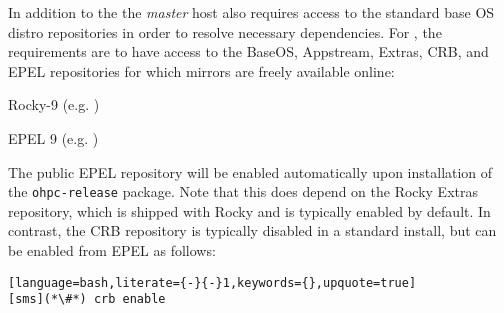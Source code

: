 In addition to the \OHPC{}
\iftoggle{isxCAT}{and \xCAT{} package repositories,}{package repository,}
the {\em master} host also requires access to the standard base OS distro
repositories in order to resolve necessary dependencies. For \baseOS{}, the
requirements are to have access to the BaseOS, Appstream, Extras, CRB,
and EPEL repositories for which mirrors are freely available online:

\begin{itemize*}
\item Rocky-9
  (e.g. \href{http://download.rockylinux.org/pub/rocky/9/}
             {\color{blue}{http://download.rockylinux.org/pub/rocky/9/}} )
\item EPEL 9 (e.g. \href{http://download.fedoraproject.org/pub/epel/9/}
                        {\color{blue}{http://download.fedoraproject.org/pub/epel/9/}} )
\end{itemize*}

\noindent The public EPEL repository will be enabled automatically upon
installation of the \texttt{ohpc-release} package. Note that this does depend
on the Rocky Extras repository, which is shipped with Rocky and is typically
enabled by default.  In contrast, the CRB repository is typically
disabled in a standard install, but can be enabled from EPEL as follows:

\begin{lstlisting}[language=bash,literate={-}{-}1,keywords={},upquote=true]
[sms](*\#*) crb enable
\end{lstlisting}
